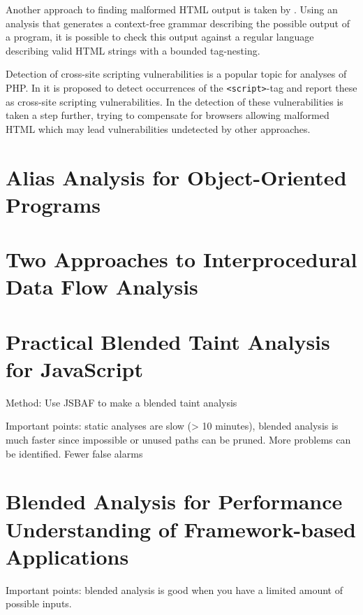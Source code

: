 Another approach to finding malformed HTML output is taken by . Using an analysis that generates a context-free grammar describing the possible output of a program, it is possible to check this output against a regular language describing valid HTML strings with a bounded tag-nesting.

Detection of cross-site scripting vulnerabilities is a popular topic for analyses of PHP. In  it is proposed to detect occurrences of the \texttt{<script>}-tag and report these as cross-site scripting vulnerabilities. In  the detection of these vulnerabilities is taken a step further, trying to compensate for browsers allowing malformed HTML which may lead vulnerabilities undetected by other approaches.


\section{Alias Analysis for Object-Oriented Programs}

\section{Two Approaches to Interprocedural Data Flow Analysis}

\section{Practical Blended Taint Analysis for JavaScript}
Method: Use JSBAF to make a blended taint analysis

Important points: static analyses are slow (> 10 minutes), blended analysis is much faster since impossible or unused paths can be pruned. More problems can be identified. Fewer false alarms

\section{Blended Analysis for Performance Understanding of Framework-based Applications}
Important points: blended analysis is good when you have a limited amount of possible inputs.
